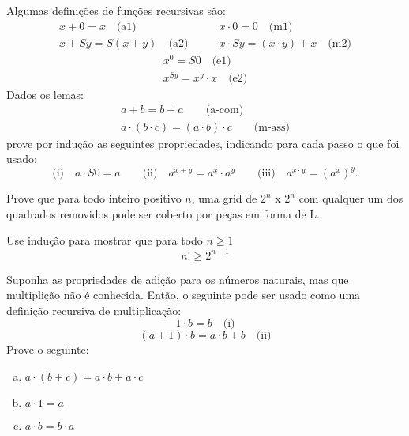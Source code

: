 \begin{exercise}
	Algumas definições de funções recursivas são:
	$$
		\left.
			\begin{aligned}
				x + 0 = x \quad \text{(a1)}\\
				x + Sy = S(x + y) \quad \text {(a2)}
			\end{aligned}
		\right.
		\qquad
		\left.
			\begin{aligned}
				x \cdot 0 = 0 \quad \text{(m1)}\\
				x \cdot Sy = (x \cdot y) + x \quad \text{(m2)}
			\end{aligned}
		\right.
	$$
	$$
		\left.
			\begin{aligned}
				x^0 = S0 \quad \text{(e1)}\\
				x^{Sy} = x^y \cdot x \quad \text{(e2)}
			\end{aligned}
		\right.
	$$
    Dados os lemas:
    $$
		\left.
			\begin{aligned}
			    a + b = b + a \qquad \text{(a-com)}\\
			    a \cdot (b \cdot c) = (a \cdot b) \cdot c \qquad \text{(m-ass)}
			\end{aligned}
		\right.
	$$
    prove por indução as seguintes propriedades, indicando para cada passo o que foi usado:
	$$
		\text{(i)}
			\quad a \cdot S0 = a
			\qquad
			\text{(ii)}
				\quad a^{x + y} = a^x \cdot a^y
			\qquad
			\text{(iii)}
				\quad a^{x \cdot y} = (a^x)^{y}.
	$$
\end{exercise}

\begin{exercise}
	Prove que para todo inteiro positivo $n$, uma grid de $2^n$ x $2^n$ com qualquer um dos quadrados removidos pode ser coberto por peças em forma de L.
\end{exercise}

\begin{exercise}
	Use indução para mostrar que para todo $n \geq 1$
	$$
	n! \geq 2^{n - 1} 
	$$
\end{exercise}

\begin{exercise}
	Suponha as propriedades de adição para os números naturais, mas que multiplição não é conhecida. Então, o seguinte pode ser usado como uma definição recursiva de multiplicação:
	$$
		1 \cdot b = b \quad \text{(i)}
	$$
	$$
		(a + 1) \cdot b = a \cdot b + b \quad \text{(ii)}
	$$
	Prove o seguinte:
	\begin{enumerate}[(a)]
		\item $a \cdot (b + c) = a \cdot b + a \cdot c$
		\item $a \cdot 1 = a$
		\item $a \cdot b = b \cdot a$
	\end{enumerate}
\end{exercise}
